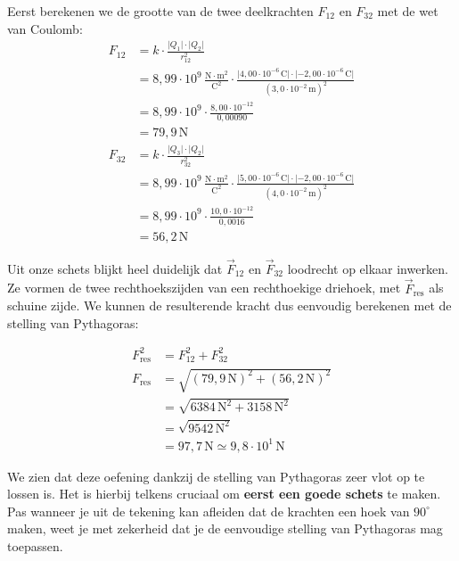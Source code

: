 \documentclass{ximera}
\begin{document}
\begin{example}[foldable=true,title={Voorbeeld: loodrechte krachten in een driehoek}]
\begin{solution}
        Eerst berekenen we de grootte van de twee deelkrachten $F_{12}$ en $F_{32}$ met de wet van Coulomb:
        \begin{align*}
            F_{12} &= k \cdot \frac{\lvert Q_{1}\rvert \cdot \lvert Q_{2}\rvert}{r^{2}_{12}} \\
            &= 8{,}99 \cdot 10^9 \, \mathrm{\frac{N\cdot m^2}{C^2}} \cdot \frac{\lvert 4{,}00 \cdot 10^{-6} \, \mathrm{C} \rvert \cdot \lvert -2{,}00 \cdot 10^{-6} \, \mathrm{C}\rvert}{(3{,}0 \cdot 10^{-2} \, \mathrm{m})^{2}} \\
            &= 8{,}99 \cdot 10^9 \cdot \frac{8{,}00 \cdot 10^{-12}}{0{,}00090} \\
            &= 79{,}9 \, \mathrm{N}
        \end{align*}    
        \begin{align*}
            F_{32} &= k \cdot \frac{\lvert Q_{3}\rvert \cdot \lvert Q_{2}\rvert}{r^{2}_{32}} \\
            &= 8{,}99 \cdot 10^9 \, \mathrm{\frac{N\cdot m^2}{C^2}} \cdot \frac{\lvert 5{,}00 \cdot 10^{-6} \, \mathrm{C}\rvert \cdot \lvert -2{,}00 \cdot 10^{-6} \, \mathrm{C}\rvert}{(4{,}0 \cdot 10^{-2} \, \mathrm{m})^{2}} \\
            &= 8{,}99 \cdot 10^9 \cdot \frac{10{,}0 \cdot 10^{-12}}{0{,}0016} \\
            &= 56{,}2 \, \mathrm{N}
        \end{align*}    
        
        Uit onze schets blijkt heel duidelijk dat $\vec{F}_{12}$ en $\vec{F}_{32}$ loodrecht op elkaar inwerken. Ze vormen de twee rechthoekszijden van een rechthoekige driehoek, met $\vec{F}_{\text{res}}$ als schuine zijde. We kunnen de resulterende kracht dus eenvoudig berekenen met de stelling van Pythagoras:
        
        \begin{align*}
            F^{2}_{\text{res}} &= F^{2}_{12} + F^{2}_{32} \\
            F_{\text{res}} &= \sqrt{(79{,}9 \, \mathrm{N})^{2} + (56{,}2 \, \mathrm{N})^{2}} \\
            &= \sqrt{6384 \, \mathrm{N}^2 + 3158 \, \mathrm{N}^2} \\
            &= \sqrt{9542 \, \mathrm{N}^2} \\
            &= 97{,}7 \, \mathrm{N} \simeq \boxed{9{,}8 \cdot 10^{1} \, \mathrm{N}}
        \end{align*}
        
    \end{solution}
\end{example}

We zien dat deze oefening dankzij de stelling van Pythagoras zeer vlot op te lossen is. Het is hierbij telkens cruciaal om \textbf{eerst een goede schets} te maken. Pas wanneer je uit de tekening kan afleiden dat de krachten een hoek van $90^\circ$ maken, weet je met zekerheid dat je de eenvoudige stelling van Pythagoras mag toepassen.
\end{document}
